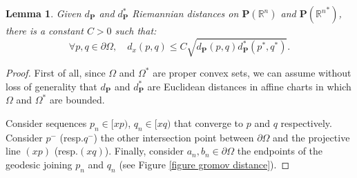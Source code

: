 \documentclass[11pt]{article}
\newcommand{\resp}{resp.\xspace}
\numberwithin{equation}{section}
\newtheorem{lemma}[theo]{Lemma}
\theoremstyle{definition}
\newcommand{\proj}{\mathbf{P}}
\newcommand{\R}{\mathbb{R}}
\begin{document}
\begin{lemma} \label{lemma gromov smaller euclid}
Given $d_\proj$ and $d_\proj^*$ Riemannian distances on $\proj(\R^n)$ and $\proj({\R^n}^*)$, there is a constant $C>0$ such that:
\[ \forall p,q\in\partial \Omega,\quad d_x(p,q) \leq C \sqrt{d_\proj(p,q) d_\proj^*(p^*,q^*)}.\]
\end{lemma}

\begin{proof}
First of all, since $\Omega$ and $\Omega^*$ are proper convex sets, we can assume without loss of generality that $d_\proj$ and $d_\proj^*$ are Euclidean distances in affine charts in which $\Omega$ and $\Omega^*$ are bounded.

Consider sequences $p_n\in[xp)$, $q_n\in[xq)$ that converge to $p$ and $q$ respectively. Consider $p^-$ (\resp $q^-$) the other intersection point between $\partial \Omega$ and the projective line $(xp)$ (\resp $(xq)$). Finally, consider $a_n,b_n\in \partial \Omega$ the endpoints of the geodesic joining $p_n$ and $q_n$ (see Figure \ref{figure gromov distance}).


\end{proof}
\end{document}
